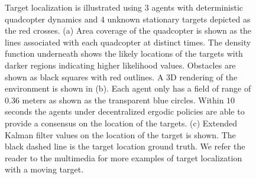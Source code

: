 \documentclass[letterpaper, 10 pt, conference]{ieeeconf}  %
\begin{document}

\begin{figure}[thpb]
\centering
{}
\caption{
Target localization is illustrated using $3$ agents with deterministic quadcopter dynamics and $4$ unknown stationary targets depicted as the red crosses.
(a) Area coverage of the quadcopter is shown as the lines associated with each quadcopter  at distinct times.
The density function underneath shows the likely locations of the targets with darker regions indicating higher likelihood values.
Obstacles are shown as black squares with red outlines. A 3D rendering of the environment is shown in (b). 
Each agent only has a field of range of $0.36$ meters as shown as the transparent blue circles.
Within $10$ seconds the agents under decentralized ergodic policies are able to provide a consensus on the location of the targets. 
(c) Extended Kalman filter values on the location of the target is shown. The black dashed line is the target location ground truth. 
We refer the reader to the multimedia for more examples of target localization with a moving target.
}
\label{fig:target_local}
\end{figure}
\end{document}
